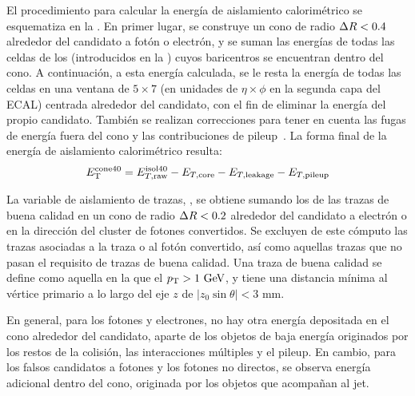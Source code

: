 El procedimiento para calcular la energía de aislamiento calorim\'etrico \etconefo se esquematiza en la \Fig{\ref{fig:objects:egamma:iso:iso_diagram}}. En primer lugar, se construye un cono de radio \(\Delta R<0.4\) alrededor del candidato a fotón o electrón, y se suman las energías de todas las celdas de los \topos (introducidos en la \Sect{\ref{subsec:objects:egamma:reco}}) cuyos baricentros se encuentran dentro del cono. A continuación, a esta energía calculada, se le resta la energía de todas las celdas en una ventana de \(5\times 7\) (en unidades de \(\eta \times \phi\) en la segunda capa del \ac{ECAL}) centrada alrededor del candidato, con el fin de eliminar la energía del propio candidato.
Tambi\'en se realizan correcciones para tener en cuenta las fugas de energ\'ia fuera del cono y las contribuciones de pileup~\cite{PileupSubstraction}. La forma final de la energ\'ia de aislamiento calorim\'etrico resulta:
\begin{equation*}
    E_{\text{T}}^{\text{cone40}}  = E_{T,\text{raw}}^{\text{isol}40} - E_{T,\text{core}} - E_{T,\text{leakage}} - E_{T,\text{pileup}}
\end{equation*}


La variable de aislamiento de trazas, \ptconetw, se obtiene sumando los \pt de las trazas de buena calidad en un cono de radio \(\Delta R<0.2\) alrededor del candidato a electrón o en la dirección del cluster de fotones convertidos.
Se excluyen de este cómputo las trazas asociadas a la traza o al fotón convertido, así como aquellas trazas que no pasan el requisito de trazas de buena calidad. Una traza de buena calidad se define como aquella en la que el \(p_{\text{T}}>1~\text{GeV}\), y tiene una distancia mínima al vértice primario a lo largo del eje \(z\) de \(|z_0 \sin \theta| < 3\) mm.

En general, para los fotones y electrones, no hay otra energía depositada en el cono alrededor del candidato, aparte de los objetos de baja energía originados por los restos de la colisión, las interacciones múltiples y el pileup. En cambio, para los falsos candidatos a fotones y los fotones no directos, se observa energía adicional dentro del cono, originada por los objetos que acompañan al jet.


